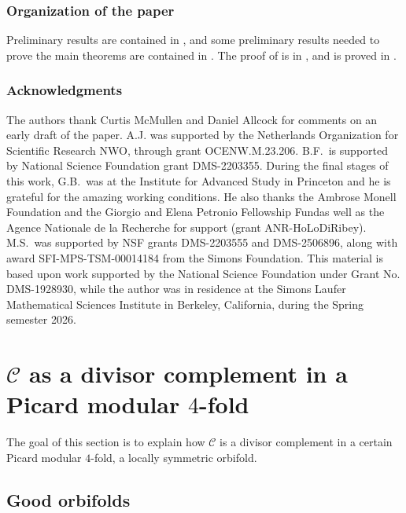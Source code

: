 \documentclass[11pt]{amsart}
\theoremstyle{plain}
\theoremstyle{definition}
\theoremstyle{remark}
\newcommand{\calC}{\mathcal{C}}
\begin{document}
\subsubsection*{Organization of the paper}

Preliminary results are contained in , and some preliminary results needed to prove the main theorems are contained in . The proof of  is in , and  is proved in 
.

\subsubsection*{Acknowledgments}

The authors thank Curtis McMullen and Daniel Allcock for comments on an early draft of the paper. A.J. was supported by the Netherlands Organization for Scientific Research NWO, through grant OCENW.M.23.206. B.F.\ is supported by National Science Foundation grant DMS-2203355. During the final stages of this work, G.B.\ was at the Institute for Advanced Study in Princeton and he is grateful for the amazing working conditions. He also thanks the Ambrose Monell Foundation and the Giorgio and Elena Petronio Fellowship Fundas well as the Agence Nationale de la Recherche for support (grant ANR-HoLoDiRibey). M.S.\ was supported by NSF grants DMS-2203555 and DMS-2506896, along with award SFI-MPS-TSM-00014184 from the Simons Foundation. This material is based upon work supported by the National Science Foundation under Grant No. DMS-1928930, while the author was in residence at the Simons Laufer Mathematical Sciences Institute in Berkeley, California, during the Spring semester 2026.

\section{$\calC$ as a divisor complement in a Picard modular $4$-fold}\label{sec:Prelims}

The goal of this section is to explain how $\calC$ is a divisor complement in a certain Picard modular $4$-fold, a locally symmetric orbifold.

\subsection{Good orbifolds}\label{sec:GoodOrb}
\end{document}
